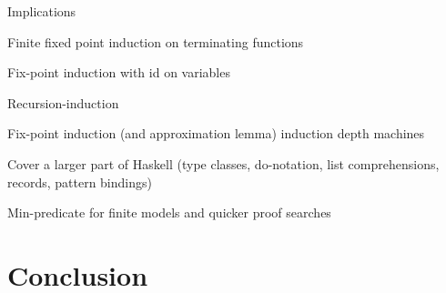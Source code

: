 \documentclass{report}
\begin{document}
Implications

Finite fixed point induction on terminating functions

Fix-point induction with id on variables

Recursion-induction

Fix-point induction (and approximation lemma) induction depth machines

Cover a larger part of Haskell (type classes, do-notation, list
comprehensions, records, pattern bindings)

Min-predicate for finite models and quicker proof searches

\section{Conclusion}




\end{document}
